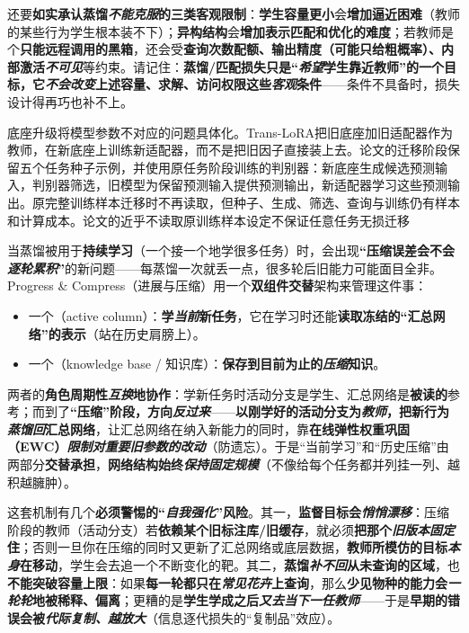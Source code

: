 还要\textbf{如实承认蒸馏\emph{不能克服}的三类客观限制}：\textbf{学生容量更小}会\textbf{增加逼近困难}（教师的某些行为学生根本装不下）；\textbf{异构结构}会\textbf{增加表示匹配和优化的难度}；若教师是个\textbf{只能远程调用的黑箱}，还会受\textbf{查询次数配额、输出精度（可能只给粗概率）、内部激活\emph{不可见}}等约束。请记住：\textbf{蒸馏/匹配损失只是“\emph{希望}学生靠近教师”的一个目标，它\emph{不会改变}上述容量、求解、访问权限这些\emph{客观}条件}——条件不具备时，损失设计得再巧也补不上。

底座升级将模型参数不对应的问题具体化。Trans-LoRA把旧底座加旧适配器作为教师，在新底座上训练新适配器，而不是把旧因子直接装上去。论文的迁移阶段保留五个任务种子示例，并使用原任务阶段训练的判别器：新底座生成候选预测输入，判别器筛选，旧模型为保留预测输入提供预测输出，新适配器学习这些预测输出。原完整训练样本迁移时不再读取，但种子、生成、筛选、查询与训练仍有样本和计算成本。论文的近乎不读取原训练样本设定不保证任意任务无损迁移

当蒸馏被用于\textbf{持续学习}（一个接一个地学很多任务）时，会出现\textbf{“压缩误差会不会\emph{逐轮累积}”}的新问题——每蒸馏一次就丢一点，很多轮后旧能力可能面目全非。Progress \& Compress（进展与压缩）用一个\textbf{双组件交替}架构来管理这件事：
\begin{itemize}\item 一个（active column）：\textbf{学\emph{当前}新任务}，它在学习时还能\textbf{读取冻结的“汇总网络”的表示}（站在历史肩膀上）。\item 一个（knowledge base / 知识库）：\textbf{保存到目前为止的\emph{压缩}知识}。\end{itemize}
两者的\textbf{角色周期性\emph{互换}地协作}：学新任务时活动分支是学生、汇总网络是\textbf{被读的}参考；而到了\textbf{“压缩”阶段，方向\emph{反过来}}——\textbf{以刚学好的活动分支为\emph{教师}，把新行为\emph{蒸馏回}汇总网络}，让汇总网络在纳入新能力的同时，靠\textbf{在线弹性权重巩固（EWC）\emph{限制对重要旧参数的改动}}（防遗忘）。于是“当前学习”和“历史压缩”由两部分\textbf{交替承担}，\textbf{网络结构始终\emph{保持固定规模}}（不像给每个任务都并列挂一列、越积越臃肿）。

这套机制有几个\textbf{必须警惕的“\emph{自我强化}”风险}。其一，\textbf{监督目标会\emph{悄悄漂移}}：压缩阶段的教师（活动分支）若\textbf{依赖某个旧标注库/旧缓存}，就必须\textbf{把那个\emph{旧版本固定}住}；否则一旦你在压缩的同时又更新了汇总网络或底层数据，\textbf{教师所模仿的目标\emph{本身}在移动}，学生会去追一个不断变化的靶。其二，\textbf{蒸馏\emph{补不回}从未查询的区域}，也\textbf{不能突破容量上限}：如果\textbf{每一轮都只在\emph{常见花卉}上查询}，那么\textbf{少见物种的能力会\emph{一轮轮}地被稀释、偏离}；更糟的是\textbf{学生学成之后\emph{又去当\emph{下一任}教师}}——于是\textbf{早期的错误会被\emph{代际复制、越放大}}（信息逐代损失的“复制品”效应）。

